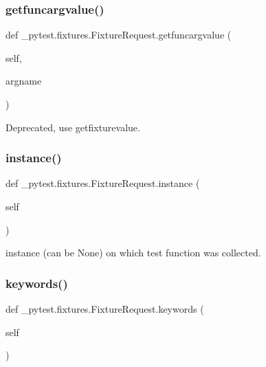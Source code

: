 \subsubsection{\texorpdfstring{getfuncargvalue()}{getfuncargvalue()}}
{\footnotesize\ttfamily def \+\_\+pytest.\+fixtures.\+Fixture\+Request.\+getfuncargvalue (\begin{DoxyParamCaption}\item[{}]{self,  }\item[{}]{argname }\end{DoxyParamCaption})}

\begin{DoxyVerb}Deprecated, use getfixturevalue. \end{DoxyVerb}
 \mbox{\label{class__pytest_1_1fixtures_1_1_fixture_request_a82d8c64637664a475cacd0fa4f5fe15a}} 
\subsubsection{\texorpdfstring{instance()}{instance()}}
{\footnotesize\ttfamily def \+\_\+pytest.\+fixtures.\+Fixture\+Request.\+instance (\begin{DoxyParamCaption}\item[{}]{self }\end{DoxyParamCaption})}

\begin{DoxyVerb}instance (can be None) on which test function was collected. \end{DoxyVerb}
 \mbox{\label{class__pytest_1_1fixtures_1_1_fixture_request_aa35d76f59a1e72f33960df812ff36844}} 
\subsubsection{\texorpdfstring{keywords()}{keywords()}}
{\footnotesize\ttfamily def \+\_\+pytest.\+fixtures.\+Fixture\+Request.\+keywords (\begin{DoxyParamCaption}\item[{}]{self }\end{DoxyParamCaption})}

